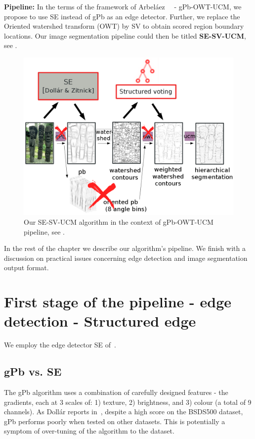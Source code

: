 \textbf{Pipeline:} In the terms of the framework of Arbel\'aez~\etal~\cite{Arbelaez11} - gPb-OWT-UCM, we propose to use SE instead of gPb as an edge detector. Further, we replace the Oriented watershed transform (OWT) by SV to obtain scored region boundary locations. Our image segmentation pipeline could then be titled \textbf{SE-SV-UCM}, see .

\begin{figure}[ht!]
\centering
 \includegraphics[width=1\textwidth]{images/SE-SV-UCM/SE-SV-UCM_pipeline.png}
\caption{Our SE-SV-UCM algorithm in the context of gPb-OWT-UCM pipeline, see .}
\label{fig:SE-SV-UCM-pipeline}
\end{figure}

In the rest of the chapter we describe our algorithm's pipeline. We finish with a discussion on practical issues concerning edge detection and image segmentation output format.

\section[First stage of the pipeline - Structured edge]{First stage of the pipeline - edge detection - Structured edge}
We employ the edge detector SE of~\cite{DollarICCV13edges,Dollar2015PAMI}.

\subsection{gPb vs. SE}
The gPb algorithm uses a combination of carefully designed features - the gradients, each at 3 scales of: 1) texture, 2) brightness, and 3) colour (a total of 9 channels). As Doll\'ar reports in~\cite{DollarICCV13edges}, despite a high score on the BSDS500 dataset, gPb performs poorly when tested on other datasets. This is potentially a symptom of over-tuning of the algorithm to the dataset.

